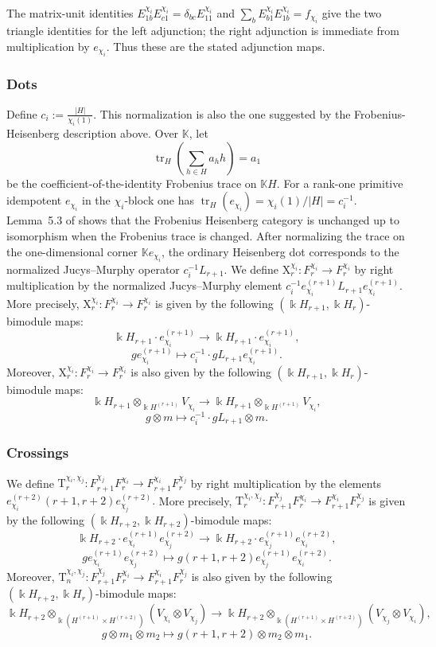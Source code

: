 \documentclass[12pt]{amsart}
\numberwithin{itemcounter}{subsection}
\theoremstyle{plain}
\theoremstyle{definition}
\theoremstyle{remark}
\numberwithin{equation}{section}
\def\bbK{\mathbb{K}}
\def\k{\Bbbk}
\begin{document}
The matrix-unit identities
$E_{1b}^{\chi_i}E_{c1}^{\chi_i}=\delta_{bc}E_{11}^{\chi_i}$ and
$\sum_bE_{b1}^{\chi_i}E_{1b}^{\chi_i}=f_{\chi_i}$ give the two triangle
identities for the left adjunction; the right adjunction is immediate from
multiplication by $e_{\chi_i}$.  Thus these are the stated adjunction maps.
\smallskip
\subsubsection{Dots}

Define $c_i:=\frac{|H|}{\chi_i(1)}$.
This normalization is also the one suggested by the Frobenius-Heisenberg description above. Over $\bbK$, let
\[
\operatorname{tr}_H\!\left(\sum_{h\in H}a_hh\right)=a_1
\]
be the coefficient-of-the-identity Frobenius trace on $\bbK H$. For a rank-one primitive idempotent $e_{\chi_i}$ in the $\chi_i$-block one has
$\operatorname{tr}_H(e_{\chi_i})=\chi_i(1)/|H|=c_i^{-1}$. Lemma~5.3 of \cite{BSW21} shows that the Frobenius Heisenberg category is unchanged up to isomorphism when the Frobenius trace is changed. After normalizing the trace on the one-dimensional corner $\bbK e_{\chi_i}$, the ordinary Heisenberg dot corresponds to the normalized Jucys--Murphy operator $c_i^{-1}L_{r+1}$.
We define $\mathrm{X}_r^{\chi_i}:F_r^{\chi_i}\to F_r^{\chi_i}$ by right multiplication by the normalized Jucys--Murphy element $c_i^{-1}e^{(r+1)}_{\chi_i}L_{r+1}e^{(r+1)}_{\chi_i}.$ More precisely, $\mathrm{X}_r^{\chi_i}:F_r^{\chi_i}\to F_r^{\chi_i}$ is given by the following $(\k H _{r+1},\k H _r)$-bimodule maps:
$$\k H _{r+1}\cdot e^{(r+1)}_{\chi_i}\to \k H _{r+1}\cdot e^{(r+1)}_{\chi_i},$$
$$g e^{(r+1)}_{\chi_i}\mapsto c_i^{-1}\cdot gL_{r+1}e^{(r+1)}_{\chi_i}.$$
Moreover, $\mathrm{X}_r^{\chi_i}:F_r^{\chi_i}\to F_r^{\chi_i}$ is also given by the following $(\k H _{r+1},\k H _r)$-bimodule maps:
$$\k H _{r+1}\otimes_{ \k H ^{(r+1)}}V_{\chi_i}\to \k H _{r+1}\otimes_{ \k H ^{(r+1)}}V_{\chi_i},$$
$$g\otimes m\mapsto c_i^{-1}\cdot gL_{r+1}\otimes m.$$
\subsubsection{Crossings}
We define $\mathrm{T}_r^{\chi_i,\chi_j}:F_{r+1}^{\chi_j}F_r^{\chi_i}\to F_{r+1}^{\chi_i}F_r^{\chi_j}$ by right multiplication by the elements $e^{(r+2)}_{\chi_i}(r+1,r+2)e^{(r+2)}_{\chi_j}.$ More precisely, $\mathrm{T}_r^{\chi_i,\chi_j}:F_{r+1}^{\chi_j}F_r^{\chi_i}\to F_{r+1}^{\chi_i}F_r^{\chi_j}$ is given by the following $(\k H _{r+2},\k H _{r+2})$-bimodule maps:
$$\k H _{r+2}\cdot e^{(r+1)}_{\chi_i}e^{(r+2)}_{\chi_j}\to \k H _{r+2}\cdot e^{(r+1)}_{\chi_j}e^{(r+2)}_{\chi_i},$$
$$ge^{(r+1)}_{\chi_i}e^{(r+2)}_{\chi_j} \mapsto g(r+1,r+2)e^{(r+1)}_{\chi_j}e^{(r+2)}_{\chi_i}.$$
Moreover, $\mathrm{T}_n^{\chi_i,\chi_j}:F_{r+1}^{\chi_j}F_r^{\chi_i}\to F_{r+1}^{\chi_i}F_r^{\chi_j}$ is also given by the following $(\k H _{r+2},\k H _{r})$-bimodule maps:
$$\k H _{r+2}\otimes_{\k( H ^{(r+1)}\times  H ^{(r+2)})}(V_{\chi_i}\otimes V_{\chi_j})\to \k H _{r+2}\otimes_{\k( H ^{(r+1)}\times H ^{(r+2)})}(V_{\chi_j}\otimes V_{\chi_i}),$$
$$g\otimes m_1\otimes m_2\mapsto g(r+1,r+2)\otimes m_2\otimes m_1.$$
\end{document}
